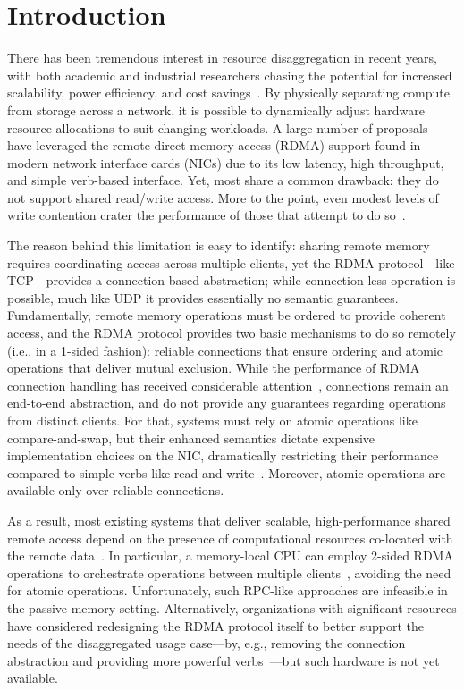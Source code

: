\section{Introduction}

There has been tremendous interest in resource disaggregation in
recent years, with both academic and industrial researchers chasing
the potential for increased scalability, power efficiency, and cost
savings~\cite{blade-server,rethinking,the-machine,requirements,clio-arxiv,firebox,leap,zombieland,storm,aifm,supernic}.
By physically separating compute from storage across a network, it is
possible to dynamically adjust hardware resource allocations to suit
changing workloads.  A large number of
proposals~\cite{infiniswap,fastswap,legoos,clover,sherman,farm,reigons}
have leveraged the remote direct memory access (RDMA) support found in
modern network interface cards (NICs) due to its low latency, high
throughput, and simple verb-based interface.  Yet, most share a common
drawback: they do not support shared read/write access.  More to the
point, even modest levels of write contention crater the performance
of those that attempt to do so~\cite{clover,sherman}.

The reason behind this limitation is easy to identify: sharing remote
memory requires coordinating access across multiple clients, yet the
RDMA protocol---like TCP---provides a connection-based abstraction;
while connection-less operation is possible, much like UDP it provides
essentially no semantic guarantees.  Fundamentally, remote memory
operations must be ordered to provide coherent access, and the RDMA
protocol provides two basic mechanisms to do so remotely (i.e., in a
1-sided fashion): reliable connections that ensure ordering and atomic
operations that deliver mutual exclusion.  While the performance of
RDMA connection handling has received considerable attention~\cite{farm,storm,scalerpc},
connections remain an end-to-end abstraction, and do not provide any
guarantees regarding operations from distinct clients.  For that,
systems must rely on atomic operations like compare-and-swap,
but their enhanced semantics dictate expensive implementation choices
on the NIC, dramatically restricting their performance compared to
simple verbs like read and write~\cite{design-guidelines}.  Moreover,
atomic operations are available only over reliable connections.

As a result, most existing systems that deliver scalable,
high-performance shared remote access depend on the presence of
computational resources co-located with the remote
data~\cite{herd,cell,farm,pilaf,storm}.  In particular, a
memory-local CPU can employ 2-sided RDMA operations to orchestrate
operations between multiple clients~\cite{herd,fasst}, avoiding the need
for atomic operations.  Unfortunately, such RPC-like approaches are
infeasible in the passive memory setting.  Alternatively,
organizations with significant resources have considered redesigning
the RDMA protocol itself to better support the needs of the
disaggregated usage case---by, e.g., removing the connection
abstraction and providing more powerful verbs~\cite{filemr,rma,star}---but such
hardware is not yet available.

